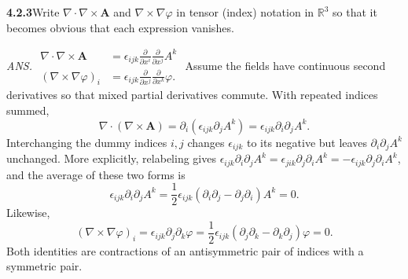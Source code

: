 
\par\bigskip
\noindent\textbf{4.2.3}\quad Write $\nabla\cdot\nabla\times\mathbf{A}$ and
$\nabla\times\nabla\varphi$ in tensor (index) notation in $\mathbb{R}^{3}$ so
that it becomes obvious that each expression vanishes.
\par\nobreak\hfill\emph{ANS.}\enspace
$\begin{aligned}
\nabla\cdot\nabla\times\mathbf{A}
&=\epsilon_{ijk}\frac{\partial}{\partial x^{i}}\frac{\partial}{\partial x^{j}}
A^{k}\\
(\nabla\times\nabla\varphi)_{i}
&=\epsilon_{ijk}\frac{\partial}{\partial x^{j}}\frac{\partial}{\partial x^{k}}
\varphi.
\end{aligned}$
\solution
Assume the fields have continuous second derivatives so that mixed
partial derivatives commute. With repeated indices summed,
\[
\nabla\cdot(\nabla\times\mathbf A)
=\partial_i(\epsilon_{ijk}\partial_jA^k)
=\epsilon_{ijk}\partial_i\partial_jA^k.
\]
Interchanging the dummy indices $i,j$ changes $\epsilon_{ijk}$ to its
negative but leaves $\partial_i\partial_jA^k$ unchanged. More explicitly,
relabeling gives
$\epsilon_{ijk}\partial_i\partial_jA^k=\epsilon_{jik}\partial_j\partial_iA^k
=-\epsilon_{ijk}\partial_j\partial_iA^k$, and the average of these two
forms is
\[
\epsilon_{ijk}\partial_i\partial_jA^k
=\frac12\epsilon_{ijk}
 (\partial_i\partial_j-\partial_j\partial_i)A^k=0.
\]
Likewise,
\[
(\nabla\times\nabla\varphi)_i
=\epsilon_{ijk}\partial_j\partial_k\varphi
=\frac12\epsilon_{ijk}
 (\partial_j\partial_k-\partial_k\partial_j)\varphi=0.
\]
Both identities are contractions of an antisymmetric pair of indices
with a symmetric pair.

